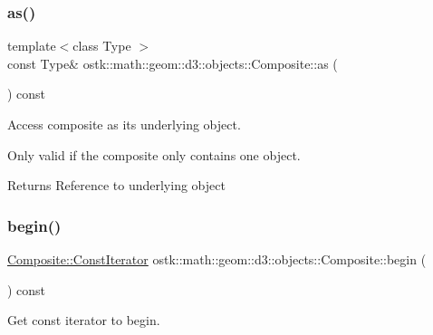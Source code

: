 \mbox{\label{classostk_1_1math_1_1geom_1_1d3_1_1objects_1_1_composite_a183fda79f9c329411533a390c77885ef}} 
\subsubsection{\texorpdfstring{as()}{as()}}
{\footnotesize\ttfamily template$<$class Type $>$ \\
const Type\& ostk\+::math\+::geom\+::d3\+::objects\+::\+Composite\+::as (\begin{DoxyParamCaption}{ }\end{DoxyParamCaption}) const\hspace{0.3cm}{\ttfamily [inline]}}



Access composite as its underlying object. 

Only valid if the composite only contains one object.

\begin{DoxyReturn}{Returns}
Reference to underlying object 
\end{DoxyReturn}
\mbox{\label{classostk_1_1math_1_1geom_1_1d3_1_1objects_1_1_composite_ab94b6cd4186515bdc1fa246756fec3cb}} 
\subsubsection{\texorpdfstring{begin()}{begin()}}
{\footnotesize\ttfamily \hyperlink{classostk_1_1math_1_1geom_1_1d3_1_1objects_1_1_composite_ab1f78408fec2e435dc1172cf2675b0a9}{Composite\+::\+Const\+Iterator} ostk\+::math\+::geom\+::d3\+::objects\+::\+Composite\+::begin (\begin{DoxyParamCaption}{ }\end{DoxyParamCaption}) const}



Get const iterator to begin. 

